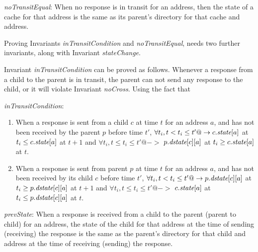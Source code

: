 \begin{inv}
\textit{noTransitEqual}: When no response is in transit for an address, then
the state of a cache for that address is the same as its parent's directory for
that cache and address.
\label{noTransitEqual}
\end{inv}

Proving Invariants \textit{inTransitCondition} and \textit{noTransitEqual},
needs two further invariants, along with Invariant \textit{stateChange}.

Invariant \textit{inTransitCondition} can be proved as follows. Whenever a
response from a child to the parent is in transit, the parent can not send any
response to the child, or it will violate Invariant \textit{noCross}. Using the fact that 







\begin{inv}
\textit{inTransitCondition}:
\begin{enumerate}
\item When a response is sent from a child $c$ at time $t$ for an address $a$,
and has not been received by the parent $p$ before time $t'$, $\forall t_i, t <
t_i \le t' @-> c.\textit{state}[a]$ at $t_i \le c.\textit{state}[a]$ at $t+1$ and $\forall t_i,
t \le t_i \le t' @->$ $p.\textit{dstate}[c][a]$ at $t_i \ge c.\textit{state}[a]$ at $t$.
\item When a response is sent from parent $p$ at time $t$ for an address $a$,
and has not been received by its child $c$ before time $t'$, $\forall t_i, t <
t_i \le t' @-> p.\textit{dstate}[c][a]$ at $t_i \ge p.\textit{dstate}[c][a]$ at $t+1$ and
$\forall t_i, t \le t_i \le t' @->$ $c.\textit{state}[a]$ at $t_i \le p.\textit{dstate}[c][a]$ at
$t$.
\end{enumerate}
\label{inTransitCondition}
\end{inv}

\begin{inv}
\textit{prevState}: When a response is received from a child to the parent
(parent to child) for an address, the state of the child for that address at
the time of sending (receiving) the response is the same as the parent's
directory for that child and address at the time of receiving (sending) the
response.
\label{prevState}
\end{inv}



